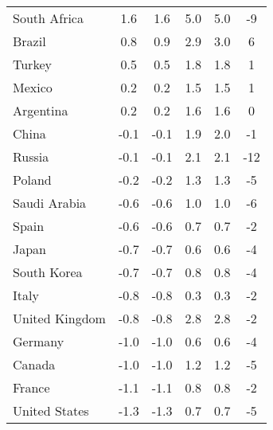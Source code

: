 \begin{tabular}[t]{lccccc}
South Africa & 1.6 & 1.6 & 5.0 & 5.0 & -9\\
Brazil & 0.8 & 0.9 & 2.9 & 3.0 & 6\\
Turkey & 0.5 & 0.5 & 1.8 & 1.8 & 1\\
Mexico & 0.2 & 0.2 & 1.5 & 1.5 & 1\\
Argentina & 0.2 & 0.2 & 1.6 & 1.6 & 0\\
China & -0.1 & -0.1 & 1.9 & 2.0 & -1\\
Russia & -0.1 & -0.1 & 2.1 & 2.1 & -12\\
Poland & -0.2 & -0.2 & 1.3 & 1.3 & -5\\
Saudi Arabia & -0.6 & -0.6 & 1.0 & 1.0 & -6\\
Spain & -0.6 & -0.6 & 0.7 & 0.7 & -2\\
Japan & -0.7 & -0.7 & 0.6 & 0.6 & -4\\
South Korea & -0.7 & -0.7 & 0.8 & 0.8 & -4\\
Italy & -0.8 & -0.8 & 0.3 & 0.3 & -2\\
United Kingdom & -0.8 & -0.8 & 2.8 & 2.8 & -2\\
Germany & -1.0 & -1.0 & 0.6 & 0.6 & -4\\
Canada & -1.0 & -1.0 & 1.2 & 1.2 & -5\\
France & -1.1 & -1.1 & 0.8 & 0.8 & -2\\
United States & -1.3 & -1.3 & 0.7 & 0.7 & -5\\
\bottomrule
\end{tabular}
